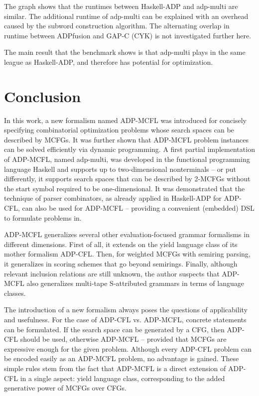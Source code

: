 \documentclass[
    a4paper,
    12pt,
    twoside,
    BCOR=12mm,
    parskip=half,
    chapterprefix,
    numbers=noenddot,
    bibliography=totoc
]{scrbook}
\begin{document}
The graph shows that the runtimes between Haskell-ADP and adp-multi are similar. The additional runtime of adp-multi can be explained with an overhead caused by the subword construction algorithm. The alternating overlap in runtime between ADPfusion and GAP-C (CYK) is not investigated further here. 

The main result that the benchmark shows is that adp-multi plays in the same league as Haskell-ADP, and therefore has potential for optimization.

  
\chapter{Conclusion}
\label{ch:concl}

In this work, a new formalism named \gls{ADP-MCFL} was introduced for concisely specifying combinatorial optimization problems whose search spaces can be described by \glspl{MCFG}. It was further shown that \gls{ADP-MCFL} problem instances can be solved efficiently via dynamic programming. A first partial implementation of \gls{ADP-MCFL}, named adp-multi, was developed in the functional programming language Haskell and supports up to two-dimensional nonterminals -- or put differently, it supports search spaces that can be described by 2-\glspl{MCFG} without the start symbol required to be one-dimensional. It was demonstrated that the technique of parser combinators, as already applied in Haskell-ADP for ADP-CFL, can also be used for \gls{ADP-MCFL} -- providing a convenient (embedded) \gls{DSL} to formulate problems in.

ADP-MCFL generalizes several other evaluation-focused grammar formalisms in different dimensions. First of all, it extends on the yield language class of its mother formalism ADP-CFL. Then, for weighted \glspl{MCFG} with semiring parsing, it generalizes in scoring schemes that go beyond semirings. Finally, although relevant inclusion relations are still unknown, the author suspects that ADP-MCFL also generalizes multi-tape S-attributed grammars in terms of language classes.

The introduction of a new formalism always poses the questions of applicability and usefulness. For the case of \gls{ADP-CFL} vs. \gls{ADP-MCFL}, concrete statements can be formulated. If the search space can be generated by a \gls{CFG}, then \gls{ADP-CFL} should be used, otherwise \gls{ADP-MCFL} -- provided that \glspl{MCFG} are expressive enough for the given problem. Although every ADP-CFL problem can be encoded easily as an ADP-MCFL problem, no advantage is gained. These simple rules stem from the fact that ADP-MCFL is a direct extension of ADP-CFL in a single aspect: yield language class, corresponding to the added generative power of \glspl{MCFG} over \glspl{CFG}.
\end{document}
